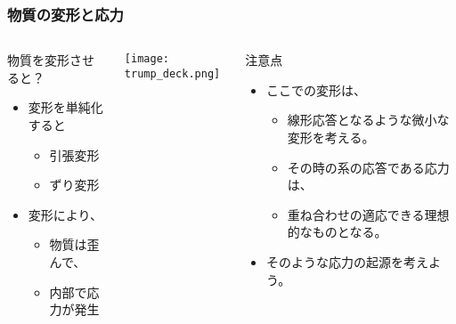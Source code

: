 \documentclass[12pt, dvipdfmx]{beamer}
\begin{document}
\begin{frame}
	\frametitle{物質の変形と応力}
		\begin{columns}[T, onlytextwidth]
				\begin{block}{物質を変形させると？}
					\begin{itemize}
						\item 変形を単純化すると
						\begin{itemize}
							\item 引張変形
							\item ずり変形
						\end{itemize}
						\item 変形により、
						\begin{itemize}
							\item 物質は歪んで、
							\item 内部で応力が発生
						\end{itemize}
					\end{itemize}
				\end{block}
				\begin{center}
					\texttt{[image: trump\_deck.png]}
				\end{center}
				\begin{exampleblock}{注意点}
					\begin{itemize}
						\item ここでの変形は、
						\begin{itemize}
							\item 線形応答となるような\alert{微小な変形}を考える。
							\item その時の系の応答である応力は、
							\item \alert{重ね合わせの適応できる理想的}なものとなる。
						\end{itemize}
						\item そのような\alert{応力の起源}を考えよう。
					\end{itemize}
				\end{exampleblock}
		\end{columns}
\end{frame}
\end{document}
